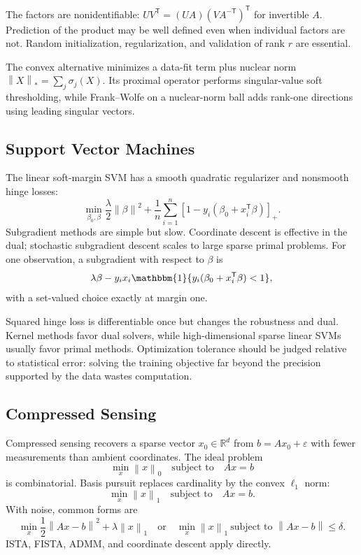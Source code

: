 \documentclass[12pt,oneside]{book}
\numberwithin{equation}{section}
\theoremstyle{definition}
\theoremstyle{plain}
\theoremstyle{remark}
\newcommand{\R}{\mathbb{R}}
\newcommand{\ind}{\mathbbm{1}}
\newcommand{\norm}[1]{\left\lVert #1 \right\rVert}
\begin{document}
The factors are nonidentifiable: $UV^\mathsf T=(UA)(VA^{-\mathsf T})^\mathsf T$
for invertible $A$. Prediction of the product may be well defined even when
individual factors are not. Random initialization, regularization, and
validation of rank $r$ are essential.

The convex alternative minimizes a data-fit term plus nuclear norm
$\norm X_*=\sum_j\sigma_j(X)$. Its proximal operator performs singular-value
soft thresholding, while Frank--Wolfe on a nuclear-norm ball adds rank-one
directions using leading singular vectors.

\subsection{Support Vector Machines}

The linear soft-margin SVM has a smooth quadratic regularizer and nonsmooth
hinge losses:
\[
 \min_{\beta_0,\beta}
 \frac\lambda2\norm\beta^2+
 \frac1n\sum_{i=1}^n[1-y_i(\beta_0+x_i^\mathsf T\beta)]_+.
\]
Subgradient methods are simple but slow. Coordinate descent is effective in
the dual; stochastic subgradient descent scales to large sparse primal
problems. For one observation, a subgradient with respect to $\beta$ is
\[
 \lambda\beta-
 y_ix_i\ind\{y_i(\beta_0+x_i^\mathsf T\beta)<1\},
\]
with a set-valued choice exactly at margin one.

Squared hinge loss is differentiable once but changes the robustness and dual.
Kernel methods favor dual solvers, while high-dimensional sparse linear SVMs
usually favor primal methods. Optimization tolerance should be judged relative
to statistical error: solving the training objective far beyond the precision
supported by the data wastes computation.

\subsection{Compressed Sensing}

Compressed sensing recovers a sparse vector $x_0\in\R^d$ from
$b=Ax_0+\varepsilon$ with fewer measurements than ambient coordinates.
The ideal problem
\[
    \min_x\norm{x}_0\quad\text{subject to}\quad Ax=b
\]
is combinatorial. Basis pursuit replaces cardinality by the convex $\ell_1$
norm:
\begin{equation}
    \min_x\norm x_1\quad\text{subject to}\quad Ax=b.
    \label{eq:basis-pursuit}
\end{equation}
With noise, common forms are
\[
 \min_x\frac12\norm{Ax-b}^2+\lambda\norm x_1
 \quad\text{or}\quad
 \min_x\norm x_1\ \text{subject to }\norm{Ax-b}\leq\delta.
\]
ISTA, FISTA, ADMM, and coordinate descent apply directly.
\end{document}
